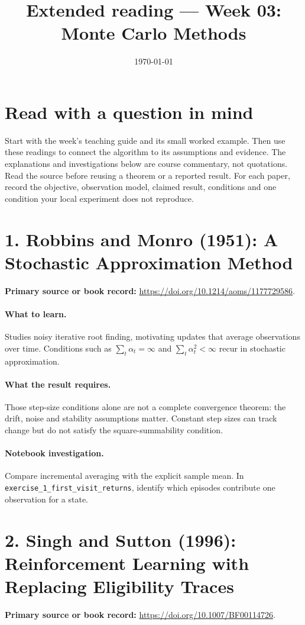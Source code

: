 \documentclass[11pt]{scrartcl}
\title{Extended reading --- Week 03: Monte Carlo Methods}
\date{\today}
\begin{document}
\maketitle
\section*{Read with a question in mind}
Start with the week's teaching guide and its small worked example. Then use
these readings to connect the algorithm to its assumptions and evidence.
The explanations and investigations below are course commentary, not
quotations. Read the source before reusing a theorem or a reported result.
For each paper, record the objective, observation model, claimed result,
conditions and one condition your local experiment does not reproduce.

\section*{1. Robbins and Monro (1951): A Stochastic Approximation Method}
\textbf{Primary source or book record:} \url{https://doi.org/10.1214/aoms/1177729586}.

\paragraph{What to learn.} Studies noisy iterative root finding, motivating updates that average observations over time. Conditions such as $\sum_t\alpha_t=\infty$ and $\sum_t\alpha_t^2<\infty$ recur in stochastic approximation.

\paragraph{What the result requires.} Those step-size conditions alone are not a complete convergence theorem: the drift, noise and stability assumptions matter. Constant step sizes can track change but do not satisfy the square-summability condition.

\paragraph{Notebook investigation.} Compare incremental averaging with the explicit sample mean. In \texttt{exercise\_1\_first\_visit\_returns}, identify which episodes contribute one observation for a state.

\section*{2. Singh and Sutton (1996): Reinforcement Learning with Replacing Eligibility Traces}
\textbf{Primary source or book record:} \url{https://doi.org/10.1007/BF00114726}.
\end{document}
